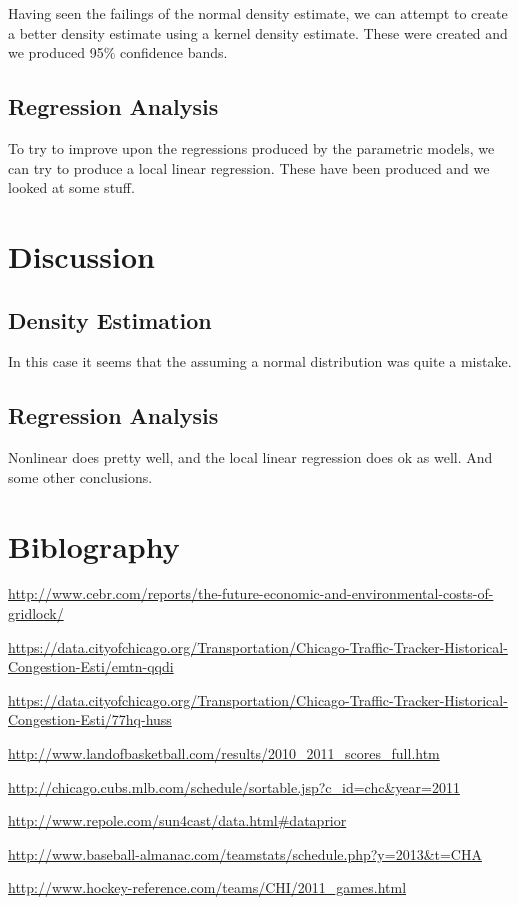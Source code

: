 \documentclass[12pt]{article}
\begin{document}
\begin{multicols*}{2}
Having seen the failings of the normal density estimate, we can attempt to create a better density estimate using a kernel density estimate. These were created and we produced 95\% confidence bands.
\subsection{Regression Analysis}
To try to improve upon the regressions produced by the parametric models, we can try to produce a local linear regression. These have been produced and we looked at some stuff.
\section{Discussion}
\subsection{Density Estimation}
In this case it seems that the assuming a normal distribution was quite a mistake. 
\subsection{Regression Analysis}
Nonlinear does pretty well, and the local linear regression does ok as well. And some other conclusions.
\section{Biblography}
\begin{thebibliography}{9}

  \url{http://www.cebr.com/reports/the-future-economic-and-environmental-costs-of-gridlock/}

  \url{https://data.cityofchicago.org/Transportation/Chicago-Traffic-Tracker-Historical-Congestion-Esti/emtn-qqdi}
  
  \url{https://data.cityofchicago.org/Transportation/Chicago-Traffic-Tracker-Historical-Congestion-Esti/77hq-huss}

  \url{http://www.landofbasketball.com/results/2010_2011_scores_full.htm}

  \url{http://chicago.cubs.mlb.com/schedule/sortable.jsp?c_id=chc&year=2011}

  \url{http://www.repole.com/sun4cast/data.html#dataprior}
	
  \url{http://www.baseball-almanac.com/teamstats/schedule.php?y=2013&t=CHA}

  \url{http://www.hockey-reference.com/teams/CHI/2011_games.html}

\end{thebibliography}
\end{multicols*}
\end{document}
